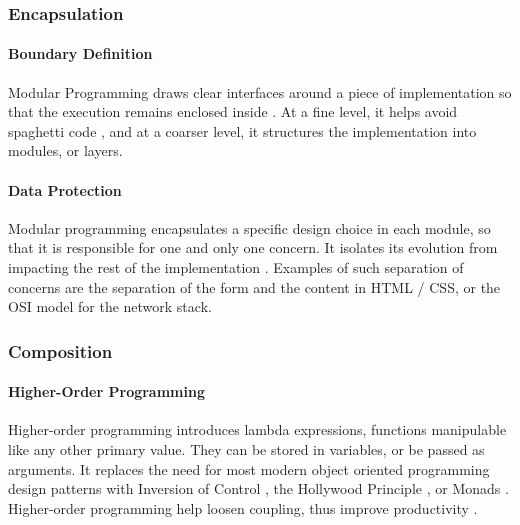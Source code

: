 

\subsubsection{Encapsulation} \label{chapter3:definitions:productivity:encapsulation}


\paragraph{Boundary Definition}
%
Modular Programming draws clear interfaces around a piece of implementation so that the execution remains enclosed inside \cite{Dijkstra1970}.
At a fine level, it helps avoid spaghetti code \cite{Dijkstra1968a}, and at a coarser level, it structures the implementation \cite{Dijkstra1968} into modules, or layers.

\paragraph{Data Protection}
%
Modular programming encapsulates a specific design choice in each module, so that it is responsible for one and only one concern.
It isolates its evolution from impacting the rest of the implementation \cite{Parnas1972, Tarr1999, Hursch1995}.
Examples of such separation of concerns are the separation of the form and the content in HTML / CSS, or the OSI model for the network stack.

\subsubsection{Composition} \label{chapter3:definitions:productivity:composition}

\paragraph{Higher-Order Programming}
Higher-order programming introduces lambda expressions, functions manipulable like any other primary value.
They can be stored in variables, or be passed as arguments.
It replaces the need for most modern object oriented programming design patterns  with Inversion of Control \cite{Johnson}, the Hollywood Principle \cite{Sweet1985}, or Monads \cite{Wadler1992}.
Higher-order programming help loosen coupling, thus improve productivity \cite{Haynes1984}.

